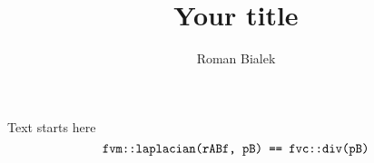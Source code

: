 \documentclass[12pt]{article}
\title{Your title}
\author{Roman Bialek}
\numberwithin{equation}{section}
\begin{document}
	\maketitle{}
	\noindent{}%
	Text starts here
	\begin{equation}
		\verb|fvm::laplacian(rABf, pB) == fvc::div(pB)|
		\notag{}
	\end{equation}
\end{document}
